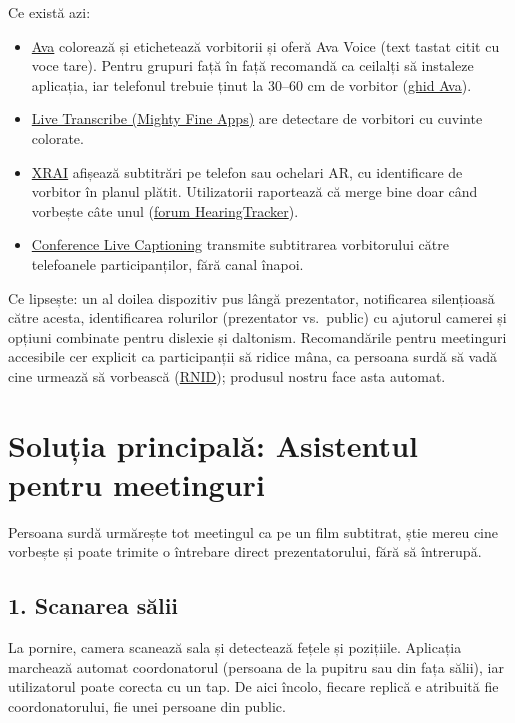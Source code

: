 \documentclass[11pt,a4paper]{article}
\begin{document}
Ce există azi:
\begin{itemize}
  \item \href{https://ava.me/blog/ava-vs-ai-media-the-ultimate-solution-for-live-captioning-needs}{Ava} colorează și etichetează vorbitorii și oferă Ava Voice (text tastat citit cu voce tare). Pentru grupuri față în față recomandă ca ceilalți să instaleze aplicația, iar telefonul trebuie ținut la 30--60 cm de vorbitor (\href{https://help.ava.me/en/articles/3157495-use-ava-to-caption-someone-face-to-face}{ghid Ava}).
  \item \href{https://apps.appfollow.io/ios/live-transcribe/1471473738?country=it}{Live Transcribe (Mighty Fine Apps)} are detectare de vorbitori cu cuvinte colorate.
  \item \href{https://www.hearingtracker.com/hearing-glasses/hear-with-your-eyes-five-ar-live-captioning-glasses}{XRAI} afișează subtitrări pe telefon sau ochelari AR, cu identificare de vorbitor în planul plătit. Utilizatorii raportează că merge bine doar când vorbește câte unul (\href{https://forum.hearingtracker.com/t/captioning-glasses-e-g-xrai-state-of-market-as-of-jan-26/110090}{forum HearingTracker}).
  \item \href{https://apps.apple.com/app/id6450253525}{Conference Live Captioning} transmite subtitrarea vorbitorului către telefoanele participanților, fără canal înapoi.
\end{itemize}

Ce lipsește: un al doilea dispozitiv pus lângă prezentator, notificarea silențioasă către acesta, identificarea rolurilor (prezentator vs.\ public) cu ajutorul camerei și opțiuni combinate pentru dislexie și daltonism. Recomandările pentru meetinguri accesibile cer explicit ca participanții să ridice mâna, ca persoana surdă să vadă cine urmează să vorbească (\href{https://rnid.org.uk/employers-and-professionals/accessible-meetings/}{RNID}); produsul nostru face asta automat.

\section*{Soluția principală: Asistentul pentru meetinguri}

Persoana surdă urmărește tot meetingul ca pe un film subtitrat, știe mereu cine vorbește și poate trimite o întrebare direct prezentatorului, fără să întrerupă.

\subsection*{1. Scanarea sălii}
La pornire, camera scanează sala și detectează fețele și pozițiile. Aplicația marchează automat coordonatorul (persoana de la pupitru sau din fața sălii), iar utilizatorul poate corecta cu un tap. De aici încolo, fiecare replică e atribuită fie coordonatorului, fie unei persoane din public.
\end{document}
